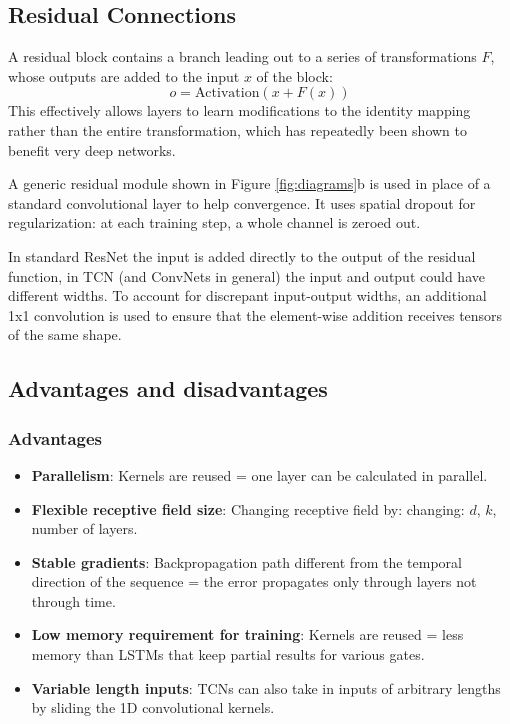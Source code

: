 \documentclass[12pt, titlepage]{article}
\begin{document}
\subsection{Residual Connections}

A residual block contains a branch leading out to a series of transformations $F$, whose outputs are added to the input $x$ of the block:
$$o = \text{Activation}(x + F(x))$$
This effectively allows layers to learn modifications to the identity mapping rather than the entire transformation, which has repeatedly been shown to benefit very deep networks.

A generic residual module shown in Figure \ref{fig:diagrams}b is used in place of a standard convolutional layer to help convergence. It uses spatial dropout for regularization: at each training step, a whole channel is zeroed out.

In standard ResNet the input is added directly to the output of the residual function, in TCN (and ConvNets in general) the input and output could have different widths. To account for discrepant input-output widths, an additional 1x1 convolution is used to ensure that the element-wise addition receives tensors of the same shape.

\subsection{Advantages and disadvantages}

\subsubsection{Advantages}
\begin{itemize}
\item \textbf{Parallelism}: Kernels are reused = one layer can be calculated in parallel.
\item \textbf{Flexible receptive field size}: Changing receptive field by: changing: $d$, $k$, number of layers.
\item \textbf{Stable gradients}: Backpropagation path different from the temporal direction of the sequence = the error propagates only through layers not through time.
\item \textbf{Low memory requirement for training}: Kernels are reused = less memory than LSTMs that keep partial results for various gates.
\item \textbf{Variable length inputs}: TCNs can also take in inputs of arbitrary lengths by sliding the 1D convolutional kernels.
\end{itemize}
\end{document}
